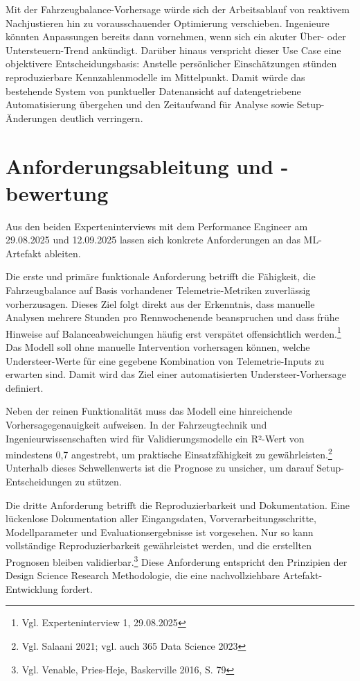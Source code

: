 Mit der Fahrzeugbalance-Vorhersage würde sich der Arbeitsablauf von reaktivem Nachjustieren hin zu vorausschauender Optimierung verschieben. Ingenieure könnten Anpassungen bereits dann vornehmen, wenn sich ein akuter Über- oder Untersteuern-Trend ankündigt. Darüber hinaus verspricht dieser Use Case eine objektivere Entscheidungsbasis: Anstelle persönlicher Einschätzungen stünden reproduzierbare Kennzahlenmodelle im Mittelpunkt. Damit würde das bestehende System von punktueller Datenansicht auf datengetriebene Automatisierung übergehen und den Zeitaufwand für Analyse sowie Setup-Änderungen deutlich verringern.



\section{Anforderungsableitung und -bewertung}

Aus den beiden Experteninterviews mit dem Performance Engineer am 29.08.2025 und 12.09.2025 lassen sich konkrete Anforderungen an das ML-Artefakt ableiten.

Die erste und primäre funktionale Anforderung betrifft die Fähigkeit, die Fahrzeugbalance auf Basis vorhandener Telemetrie-Metriken zuverlässig vorherzusagen. Dieses Ziel folgt direkt aus der Erkenntnis, dass manuelle Analysen mehrere Stunden pro Rennwochenende beanspruchen und dass frühe Hinweise auf Balanceabweichungen häufig erst verspätet offensichtlich werden.\footnote{Vgl. Experteninterview 1, 29.08.2025} Das Modell soll ohne manuelle Intervention vorhersagen können, welche Understeer-Werte für eine gegebene Kombination von Telemetrie-Inputs zu erwarten sind. Damit wird das Ziel einer automatisierten Understeer-Vorhersage definiert.

Neben der reinen Funktionalität muss das Modell eine hinreichende 
Vorhersagegenauigkeit aufweisen. In der Fahrzeugtechnik und 
Ingenieurwissenschaften wird für Validierungsmodelle ein R²-Wert 
von mindestens 0,7 angestrebt, um praktische Einsatzfähigkeit 
zu gewährleisten.\footnote{Vgl. Salaani 2021; vgl. auch 365 Data Science 2023} 
Unterhalb dieses Schwellenwerts ist die Prognose zu unsicher, 
um darauf Setup-Entscheidungen zu stützen.

Die dritte Anforderung betrifft die Reproduzierbarkeit und Dokumentation. Eine lückenlose Dokumentation aller Eingangsdaten, Vorverarbeitungsschritte, Modellparameter und Evaluationsergebnisse ist vorgesehen. Nur so kann vollständige Reproduzierbarkeit gewährleistet werden, und die erstellten Prognosen bleiben validierbar.\footnote{Vgl. Venable, Pries-Heje, Baskerville 2016, S. 79} Diese Anforderung entspricht den Prinzipien der Design Science Research Methodologie, die eine nachvollziehbare Artefakt-Entwicklung fordert.


